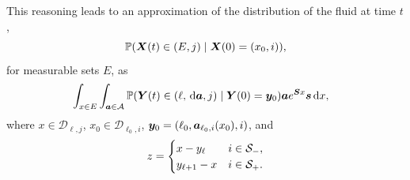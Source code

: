 This reasoning leads to an approximation of the distribution of the fluid at time \(t\), 
\[\mathbb P(\boldsymbol X(t)\in{}(E,j) \mid \boldsymbol X(0)=(x_0,i)),\]
for measurable sets \(E\), as
\begin{align}
		&\int_{x\in E}\int_{\boldsymbol a \in\mathcal A}\mathbb P(\boldsymbol Y(t) \in{}(\ell, \, \mathrm{d} \boldsymbol a, j)\mid \boldsymbol Y(0)=\boldsymbol y_0)
		\boldsymbol a e^{\boldsymbol{S}x} \boldsymbol s \, \mathrm{d} x,
		\label{eqn: density approx aug}
\end{align}
where \(x\in\mathcal D_{\ell,j}\), \(x_0\in\mathcal D_{\ell_0,i}\), \(\boldsymbol y_0 = (\ell_0,\boldsymbol a_{\ell_0,i}(x_0),i)\), and 
\[
	z = \begin{cases} 
		x - y_\ell & i\in\mathcal{S}_-, \\
		y_{\ell+1} - x & i\in\mathcal{S}_+.
	\end{cases}
\]

